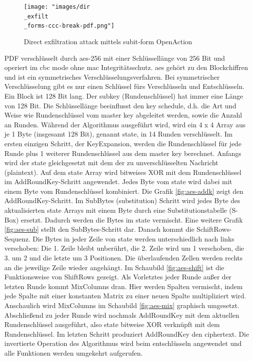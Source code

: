 \begin{figure}[!htb]
	\centering
	\texttt{[image: "images/dir\\\_exfilt\\\_forms-ccc-break-pdf.png"]}
	\caption{Direct exfiltration attack mittels subit-form OpenAction \cite{ccc-break-pdf}}
	\label{fig:dir-exfil}
\end{figure}

PDF verschlüsselt durch \gls{aes}-256 mit einer Schlüssellänge von 256 Bit und operiert im \gls{cbc} mode ohne \gls{mac} Integritätsschutz. \gls{aes} gehört zu den Blockchiffren und ist ein symmetrisches Verschlüsselungsverfahren. Bei symmetrischer Verschlüsselung gibt es nur einen Schlüssel fürs Verschlüsseln und Entschlüsseln. Ein Block ist 128 Bit lang. Der subkey (Rundenschlüssel) hat immer eine Länge von 128 Bit. Die Schlüssellänge beeinflusst den key schedule, d.h. die Art und Weise wie Rundenschlüssel vom master key abgeleitet werden, sowie die Anzahl an Runden. Während der Algorithmus ausgeführt wird, wird ein 4 x 4 Array aus je 1 Byte (insgesamt 128 Bit), genannt state, in 14 Runden verschlüsselt. Im ersten einzigen Schritt, der KeyExpansion, werden die Rundenschlüssel für jede Runde plus 1 weiterer Rundenschlüssel aus dem master key berechnet. Anfangs wird der state gleichgesetzt mit dem der zu unverschlüsselten Nachricht (plaintext). Auf dem state Array wird bitweises XOR mit dem Rundenschlüssel im AddRoundKey-Schritt angewendet. Jedes Byte vom state wird dabei mit einem Byte vom Rundenschlüssel kombiniert. Die Grafik \ref{fig:aes-addk} zeigt den AddRoundKey-Schritt. Im SubBytes (substitution) Schritt wird jedes Byte des aktualisierten state Arrays mit einem Byte durch eine Substitutionstabelle (S-Box) ersetzt. Dadurch werden die Bytes im state vermischt. Eine weitere Grafik \ref{fig:aes-sub} stellt den SubBytes-Schritt dar. Danach kommt die SchiftRows-Sequenz. Die Bytes in jeder Zeile von state werden unterschiedlich nach links verschoben: Die 1. Zeile bleibt unberührt, die 2. Zeile wird um 1 verschoben, die 3. um 2 und die letzte um 3 Positionen. Die überlaufenden Zellen werden rechts an die jeweilige Zeile wieder angehängt. Im Schaubild \ref{fig:aes-shift} ist die Funktionsweise von ShiftRows gezeigt. Als Vorletztes jeder Runde außer der letzten Runde kommt MixColumns dran. Hier werden Spalten vermischt, indem jede Spalte mit einer konstanten Matrix zu einer neuen Spalte multipliziert wird. Anschaulich wird MixColumns im Schaubild \ref{fig:aes-mix} graphisch umgesetzt. Abschließend zu jeder Runde wird nochmals AddRoundKey mit dem aktuellen Rundenschlüssel ausgeführt, also state bitweise XOR verknüpft mit dem Rundenschlüssel. Im letzten Schritt produziert AddRoundKey den ciphertext. Die invertierte Operation des Algorithmus wird beim entschlüsseln angewendet und alle Funktionen werden umgekehrt aufgerufen. \cite{intro-crypto, studyflix-aes, simply-aes} \\


